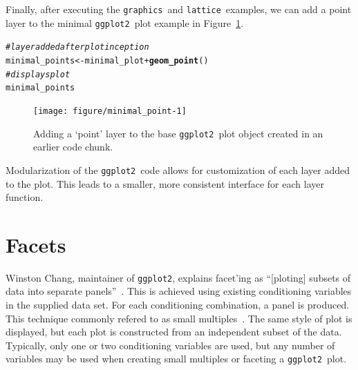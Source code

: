 \documentclass[stat,dissertation]{puthesis}\usepackage[]{graphicx}\usepackage{xcolor}
\makeatletter
\newcommand{\hlcom}[1]{\textcolor[rgb]{0.678,0.584,0.686}{\textit{#1}}}%
\newcommand{\hlopt}[1]{\textcolor[rgb]{0,0,0}{#1}}%
\newcommand{\hlstd}[1]{\textcolor[rgb]{0.345,0.345,0.345}{#1}}%
\newcommand{\hlkwb}[1]{\textcolor[rgb]{0.69,0.353,0.396}{#1}}%
\newcommand{\hlkwd}[1]{\textcolor[rgb]{0.737,0.353,0.396}{\textbf{#1}}}%
\newenvironment{kframe}{%
 \def\at@end@of@kframe{}%
 \ifinner\ifhmode%
  \def\at@end@of@kframe{\end{minipage}}%
  \begin{minipage}{\columnwidth}%
 \fi\fi%
 \def\FrameCommand##1{\hskip\@totalleftmargin \hskip-\fboxsep
 \colorbox{shadecolor}{##1}\hskip-\fboxsep
     \hskip-\linewidth \hskip-\@totalleftmargin \hskip\columnwidth}%
 \MakeFramed {\advance\hsize-\width
   \@totalleftmargin\z@ \linewidth\hsize
   \@setminipage}}%
 {\par\unskip\endMakeFramed%
 \at@end@of@kframe}
\newenvironment{knitrout}{}{} %
\renewenvironment{knitrout}{\setstretch{1}}{}
\newcommand{\pkg}[1]{\texttt{#1}}
\newcommand{\ggplot}{\pkg{ggplot2}}
\makeatother
\begin{document}
Finally, after executing the \pkg{graphics}~and \pkg{lattice}~examples, we can add a point layer to the minimal \ggplot~plot example in Figure~\ref{fig:minimal_point}.

\begin{knitrout}\small
{}\color{fgcolor}\begin{kframe}
\begin{alltt}
\hlcom{# layer added after plot inception}
\hlstd{minimal_points} \hlkwb{<-} \hlstd{minimal_plot} \hlopt{+} \hlkwd{geom_point}\hlstd{()}
\hlcom{# displays plot}
\hlstd{minimal_points}
\end{alltt}
\end{kframe}\begin{figure}[H]

{\centering \texttt{[image: figure/minimal\_point-1]} 

}

\caption{Adding a `point' layer to the base \ggplot~plot object created in an earlier code chunk.}\label{fig:minimal_point}
\end{figure}


\end{knitrout}

Modularization of the \ggplot~code allows for customization of each layer added to the plot.  This leads to a smaller, more consistent interface for each layer function.



\section{Facets}



Winston Chang, maintainer of \ggplot, explains facet'ing as ``[ploting] subsets of data into separate panels''~\cite{chang2013rgc}.  This is achieved using existing conditioning variables in the supplied data set. For each conditioning combination, a panel is produced. This technique commonly refered to as small multiples~\cite{small_multiples}.  The same style of plot is displayed, but each plot is constructed from an independent subset of the data.  Typically, only one or two conditioning variables are used, but any number of variables may be used when creating small multiples or faceting a \ggplot~plot.
\end{document}
